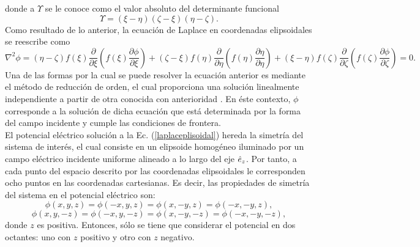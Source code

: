 donde a $\Upsilon$ se le conoce como el valor absoluto del determinante funcional \cite{Kellog}
\begin{equation}
	\Upsilon=(\xi-\eta)(\zeta-\xi)(\eta-\zeta).
\end{equation}
Como resultado de lo anterior, la ecuación de Laplace en coordenadas elipsoidales se reescribe como
\begin{equation}
	\nabla^2\phi=(\eta-\zeta)f(\xi)\frac{\partial}{\partial\xi}\left(f(\xi)\frac{\partial\phi}{\partial\xi}\right)+(\zeta-\xi)f(\eta)\frac{\partial}{\partial\eta}\left(f(\eta)\frac{\partial\eta}{\partial\eta}\right)+(\xi-\eta)f(\zeta)\frac{\partial}{\partial\zeta}\left(f(\zeta)\frac{\partial\phi}{\partial\zeta}\right)=0.
	\label{laplaceplisoidal}
\end{equation}
Una de las formas por la cual se puede resolver la ecuación anterior es mediante el método de reducción de orden, el cual proporciona una solución linealmente independiente a partir de otra conocida con anterioridad \cite{Braun}. En éste contexto, $\phi$ corresponde a la solución de dicha ecuación que está determinada por la forma del campo incidente y cumple las condiciones de frontera. \\


El potencial eléctrico solución a la Ec. (\ref{laplaceplisoidal}) hereda la simetría del sistema de interés, el cual consiste en un elipsoide homogéneo iluminado por un campo eléctrico incidente uniforme alineado a lo largo del eje $\hat{e}_{z}$. Por tanto,  a cada punto del espacio descrito por las coordenadas elipsoidales le corresponden ocho puntos en las coordenadas cartesianas. Es decir, las propiedades de simetría del sistema en el potencial eléctrico son:
\begin{equation}
    \phi(x,y,z)=\phi(-x,y,z)=\phi(x,-y,z)=\phi(-x,-y,z),
\end{equation}
\begin{equation}
    \phi(x,y,-z)=\phi(-x,y ,-z)=\phi(x,-y,-z)=\phi(-x,-y,-z),
\end{equation}
donde $z$ es positiva. Entonces, sólo se tiene que considerar el potencial en dos octantes: uno con $z$ positivo y otro con $z$ negativo. \\

